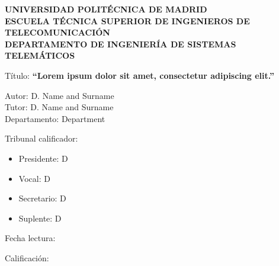 %
%
%
%
%
%
\begin{center}
\textbf{UNIVERSIDAD POLIT\'{E}CNICA DE MADRID\\
ESCUELA T\'{E}CNICA SUPERIOR DE INGENIEROS DE TELECOMUNICACI\'{O}N\\
DEPARTAMENTO DE INGENIER\'{I}A DE SISTEMAS TELEM\'{A}TICOS\\}

\vspace{1cm}

T\'{i}tulo: \textbf{``Lorem ipsum dolor sit amet, consectetur adipiscing elit.''}
\end{center}
\vspace{1cm}

\noindent Autor: D. Name and Surname\\
Tutor: D. Name and Surname\\
Departamento: Department\\

\vspace{2cm}

\noindent Tribunal calificador:
\begin{itemize}
\item Presidente: D
\item Vocal: D
\item Secretario: D
\item Suplente: D
\end{itemize}
\vspace{2cm}
\noindent Fecha lectura: \\

\vspace*{2cm}

\noindent Calificaci\'{o}n:
\thispagestyle{empty}
\pagebreak
\newpage
\thispagestyle{empty}
\mbox{}
\pagebreak


